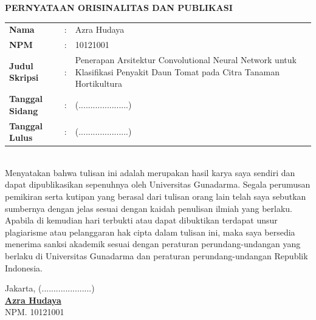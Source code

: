 \documentclass[12pt,a4paper,oneside]{report}
\begin{document}
\begin{center}
  {\fontsize{14}{16}\bfseries PERNYATAAN ORISINALITAS DAN PUBLIKASI}\\[1cm]
\end{center}

\noindent
\begin{tabular}{p{3.2cm}cp{10.5cm}}
  \textbf{Nama} & : & Azra Hudaya \\
  \textbf{NPM} & : & 10121001 \\
  \textbf{Judul Skripsi} & : & Penerapan Arsitektur Convolutional Neural Network untuk Klasifikasi Penyakit Daun Tomat pada Citra Tanaman Hortikultura \\
  \textbf{Tanggal Sidang} & : & (.....................) \\
  \textbf{Tanggal Lulus} & : & (.....................)
\end{tabular}\\[0.8cm]

\noindent
Menyatakan bahwa tulisan ini adalah merupakan hasil karya saya sendiri dan dapat dipublikasikan sepenuhnya oleh Universitas Gunadarma. Segala perumusan pemikiran serta kutipan yang berasal dari tulisan orang lain telah saya sebutkan sumbernya dengan jelas sesuai dengan kaidah penulisan ilmiah yang berlaku.\\[0.4cm]

\noindent
Apabila di kemudian hari terbukti atau dapat dibuktikan terdapat unsur plagiarisme atau pelanggaran hak cipta dalam tulisan ini, maka saya bersedia menerima sanksi akademik sesuai dengan peraturan perundang-undangan yang berlaku di Universitas Gunadarma dan peraturan perundang-undangan Republik Indonesia.\\[1.5cm]

\begin{flushright}
  \begin{minipage}{0.45\textwidth}
    Jakarta, (.....................)\\[2.2cm]
    \underline{\textbf{Azra Hudaya}}\\
    NPM. 10121001
  \end{minipage}
\end{flushright}
\newpage
\end{document}
